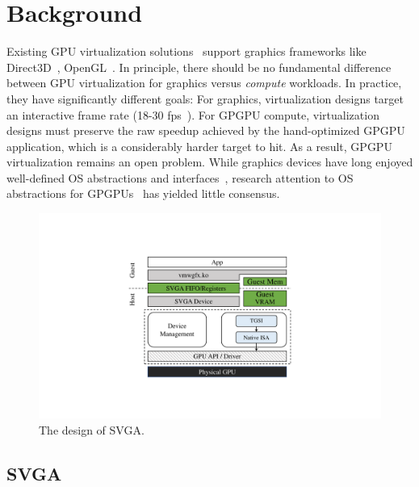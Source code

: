 
\section{Background}
\label{sec_background}

Existing GPU virtualization solutions~\cite{dowty2009gpu, VGML} support
graphics frameworks like Direct3D~\cite{directX}, OpenGL~\cite{openGLspec}.
In principle, there should be no fundamental difference between GPU virtualization for graphics versus \emph{compute} workloads.
In practice, they have significantly different goals:
For graphics, virtualization designs target an interactive frame rate (18-30
fps~\cite{frame_rate}). For GPGPU compute, virtualization designs must
preserve the raw speedup achieved by the hand-optimized GPGPU application,
which is a considerably harder target to hit. As a result, GPGPU virtualization
remains an open problem. While graphics devices have long enjoyed well-defined
OS abstractions and interfaces~\cite{winGDI},
research attention to OS abstractions for GPGPUs~\cite{rossbach2011ptask, dandelion, silberstein2013gpufs, timegraph, gdev, gpunet} has yielded little consensus.

\begin{figure}[!th]
	\centering
	\includegraphics[width=.75\linewidth,trim={6cm 3cm 6cm 3cm},clip]{trillium/images/svga.pdf}
	\caption{{\footnotesize The design of SVGA.}}
	\label{fig_svga} \end{figure}

\subsection{SVGA}
\label{sec:svga}

